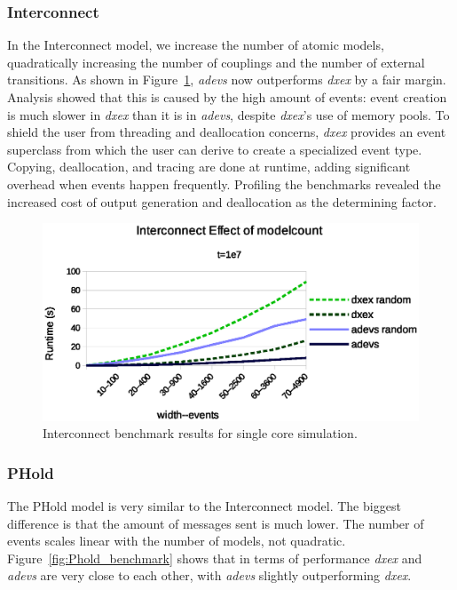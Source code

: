 \subsubsection{Interconnect}
\label{4-seq-Interconnect}
In the Interconnect model, we increase the number of atomic models, quadratically increasing the number of couplings and the number of external transitions.
As shown in Figure~\ref{fig:Interconnect_benchmark}, \textit{adevs} now outperforms \textit{dxex} by a fair margin.
Analysis showed that this is caused by the high amount of events: event creation is much slower in \textit{dxex} than it is in \textit{adevs}, despite \textit{dxex}'s use of memory pools.
To shield the user from threading and deallocation concerns, \textit{dxex} provides an event superclass from which the user can derive to create a specialized event type.
Copying, deallocation, and tracing are done at runtime, adding significant overhead when events happen frequently.
Profiling the benchmarks revealed the increased cost of output generation and deallocation as the determining factor.

\begin{figure}
	\center
	\includegraphics[width=\columnwidth]{fig/interconnect_sequential.eps}
	\caption{Interconnect benchmark results for single core simulation.}
	\label{fig:Interconnect_benchmark}
\end{figure}

\subsubsection{PHold}
\label{4-seq-PHold}
The PHold model is very similar to the Interconnect model.
The biggest difference is that the amount of messages sent is much lower.
The number of events scales linear with the number of models, not quadratic.
Figure~\ref{fig:Phold_benchmark} shows that in terms of performance \textit{dxex} and \textit{adevs} are very close to each other, with \textit{adevs} slightly outperforming \textit{dxex}.

